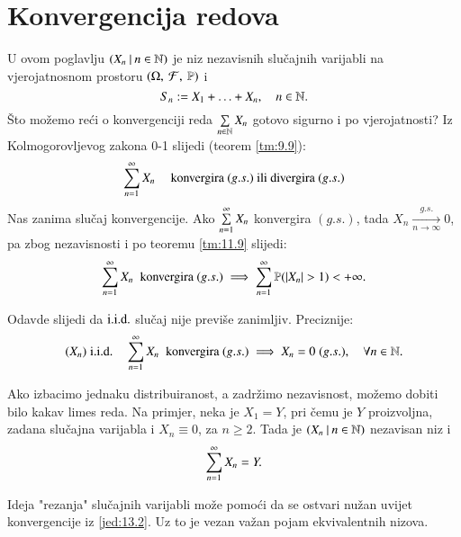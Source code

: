 
\chapter{Konvergencija redova}

U ovom poglavlju $({X_n} \: | \: {n \in \mathbb{N}})$ je niz nezavisnih slu\v cajnih varijabli na vjerojatnosnom prostoru $(\Omega, \: \mathcal{F}, \: \mathbb{P})$ i
\begin{equation*}
    S_n := X_1 + \ldots + X_n, \quad n \in \mathbb{N}.
\end{equation*}
\v Sto mo\v zemo re\' ci o konvergenciji reda $\sum\limits_{n \in \mathbb{N}}^{} X_n$ gotovo sigurno i po vjerojatnosti?
Iz Kolmogorovljevog zakona 0-1 slijedi (teorem \ref{tm:9.9}):
\begin{equation}    \label{jed:13.1}
    \sum\limits_{n = 1}^{\infty} X_n \quad \textnormal{ konvergira } (g.s.) \textnormal{ ili divergira } (g.s.)
\end{equation}
Nas zanima slu\v caj konvergencije.
Ako $\sum\limits_{n = 1}^{\infty} X_n$ konvergira $(g.s.)$, tada $X_n \xrightarrow[n \to \infty]{g.s.} 0$, pa zbog nezavisnosti i po teoremu \ref{tm:11.9} slijedi:
\begin{equation}    \label{jed:13.2}
    \sum\limits_{n = 1}^{\infty} X_n \; \textnormal{ konvergira } (g.s.) \implies \sum\limits_{n = 1}^{\infty} \mathbb{P}({|X_n| > 1}) < +\infty.
\end{equation}

Odavde slijedi da $\mathrm{i.i.d.}$ slu\v caj nije previ\v se zanimljiv.
Preciznije:
\begin{equation}    \label{jed:13.3}
    (X_n) \; \mathrm{i.i.d.} \quad \sum\limits_{n = 1}^{\infty} X_n \; \textnormal{ konvergira } (g.s.) \implies X_n = 0 \; (g.s.), \quad \forall n \in \mathbb{N}. 
\end{equation}

\begin{nap} \label{nap:13.4}
    Ako izbacimo jednaku distribuiranost, a zadr\v zimo nezavisnost, mo\v zemo dobiti bilo kakav limes reda.
    Na primjer, neka je $X_1 = Y$, pri \v cemu je $Y$ proizvoljna, zadana slu\v cajna varijabla i $X_n \equiv 0$, za $n \geq 2$.
    Tada je $({X_n} \: | \: {n \in \mathbb{N}})$ nezavisan niz i
    \begin{equation*}
        \sum\limits_{n = 1}^{\infty} X_n = Y.
    \end{equation*}
\end{nap}

\begin{nap} \label{nap:13.5}
    Ideja "rezanja" slu\v cajnih varijabli mo\v ze pomo\' ci da se ostvari nu\v zan uvijet konvergencije iz \eqref{jed:13.2}.
    Uz to je vezan va\v zan pojam ekvivalentnih nizova.
\end{nap}

